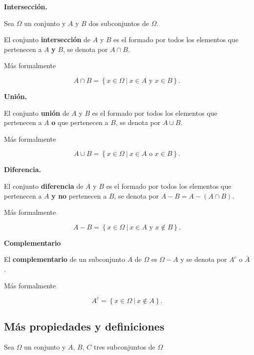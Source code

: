 \documentclass[]{book}
\begin{document}
\textbf{Intersección.}

Sea \(\Omega\) un conjunto y \(A\) y \(B\) dos subconjuntos de \(\Omega\).

El conjunto \textbf{intersección} de \(A\) y \(B\) es el formado por todos los elementos que pertenecen a \(A\) \textbf{y} \(B\), se denota por \(A\cap B\).

Más formalmente

\[
A\cap B=\left\{x\in\Omega \ \big|\  x\in A \mbox{ y } x\in B\right\}.
\]

\textbf{Unión.}

El conjunto \textbf{unión} de \(A\) y \(B\) es el formado por todos los elementos que pertenecen a \(A\) \textbf{o} que pertenecen a \(B\), se denota por \(A\cup B\).

Más formalmente

\[
A\cup B=\left\{x\in\Omega\ \big|\  x\in A \mbox{ o } x\in B\right\}.
\]

\textbf{Diferencia.}

El conjunto \textbf{diferencia} de \(A\) y \(B\) es el formado por todos los elementos que pertenecen a \(A\) \textbf{y no} pertenecen a \(B\), se denota por \(A-B=A-(A\cap B)\).

Más formalmente

\[
A- B=\left\{x\in\Omega \ \big|\ x\in A \mbox{ y } x\notin B\right\}.
\]

\textbf{Complementario}

El \textbf{complementario} de un subconjunto \(A\) de \(\Omega\) es \(\Omega-A\) y se denota por \(A^c\) o \(\bar{A}\).

Más formalmente

\[
A^c=\left\{x\in\Omega \ \big|\  x\not\in A\right\}.
\]

\hypertarget{muxe1s-propiedades-y-definiciones}{%
\subsection{Más propiedades y definiciones}\label{muxe1s-propiedades-y-definiciones}}

Sea \(\Omega\) un conjunto y \(A\), \(B\), \(C\) tres subconjuntos de \(\Omega\)
\end{document}
